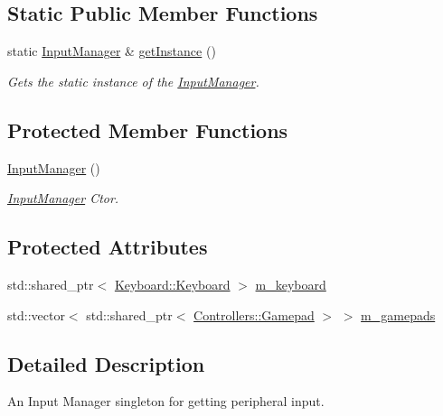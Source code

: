 \subsection*{Static Public Member Functions}
\begin{DoxyCompactItemize}
\item 
static \hyperlink{class_cookie_eng_1_1_input_1_1_input_manager}{Input\+Manager} \& \hyperlink{class_cookie_eng_1_1_input_1_1_input_manager_a0ae972a3fda8747b2b9cc6bb9417dfa8}{get\+Instance} ()
\begin{DoxyCompactList}\small\item\em Gets the static instance of the \hyperlink{class_cookie_eng_1_1_input_1_1_input_manager}{Input\+Manager}. \end{DoxyCompactList}\end{DoxyCompactItemize}
\subsection*{Protected Member Functions}
\begin{DoxyCompactItemize}
\item 
\hyperlink{class_cookie_eng_1_1_input_1_1_input_manager_a6464eabb341068379430b90ec922047a}{Input\+Manager} ()
\begin{DoxyCompactList}\small\item\em \hyperlink{class_cookie_eng_1_1_input_1_1_input_manager}{Input\+Manager} Ctor. \end{DoxyCompactList}\end{DoxyCompactItemize}
\subsection*{Protected Attributes}
\begin{DoxyCompactItemize}
\item 
std\+::shared\+\_\+ptr$<$ \hyperlink{class_cookie_eng_1_1_input_1_1_keyboard_1_1_keyboard}{Keyboard\+::\+Keyboard} $>$ \hyperlink{class_cookie_eng_1_1_input_1_1_input_manager_aa8137e98a8515c6da82cd3ca4f2f04bf}{m\+\_\+keyboard}
\item 
std\+::vector$<$ std\+::shared\+\_\+ptr$<$ \hyperlink{class_cookie_eng_1_1_input_1_1_controllers_1_1_gamepad}{Controllers\+::\+Gamepad} $>$ $>$ \hyperlink{class_cookie_eng_1_1_input_1_1_input_manager_ae0b4f61fc7337f58498b9d6eda637384}{m\+\_\+gamepads}
\end{DoxyCompactItemize}


\subsection{Detailed Description}
An Input Manager singleton for getting peripheral input. 

